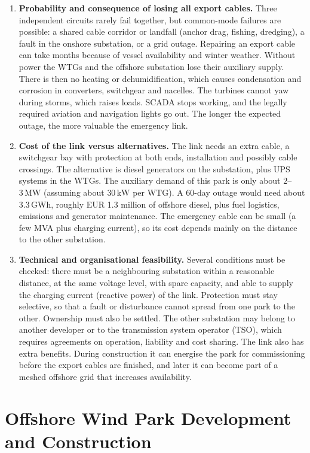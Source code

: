 \begin{enumerate}
    \item \textbf{Probability and consequence of losing all export cables.} Three independent circuits rarely fail together, but common-mode failures are possible: a shared cable corridor or landfall (anchor drag, fishing, dredging), a fault in the onshore substation, or a grid outage. Repairing an export cable can take months because of vessel availability and winter weather. Without power the WTGs and the offshore substation lose their auxiliary supply. There is then no heating or dehumidification, which causes condensation and corrosion in converters, switchgear and nacelles. The turbines cannot yaw during storms, which raises loads. SCADA stops working, and the legally required aviation and navigation lights go out. The longer the expected outage, the more valuable the emergency link.
    \item \textbf{Cost of the link versus alternatives.} The link needs an extra cable, a switchgear bay with protection at both ends, installation and possibly cable crossings. The alternative is diesel generators on the substation, plus UPS systems in the WTGs. The auxiliary demand of this park is only about $2$--$3\,\mathrm{MW}$ (assuming about $30\,\mathrm{kW}$ per WTG). A 60-day outage would need about $3.3\,\mathrm{GWh}$, roughly EUR 1.3 million of offshore diesel, plus fuel logistics, emissions and generator maintenance. The emergency cable can be small (a few MVA plus charging current), so its cost depends mainly on the distance to the other substation.
    \item \textbf{Technical and organisational feasibility.} Several conditions must be checked: there must be a neighbouring substation within a reasonable distance, at the same voltage level, with spare capacity, and able to supply the charging current (reactive power) of the link. Protection must stay selective, so that a fault or disturbance cannot spread from one park to the other. Ownership must also be settled. The other substation may belong to another developer or to the transmission system operator (TSO), which requires agreements on operation, liability and cost sharing. The link also has extra benefits. During construction it can energise the park for commissioning before the export cables are finished, and later it can become part of a meshed offshore grid that increases availability.
\end{enumerate}

\section{Offshore Wind Park Development and Construction}
\label{sec:elec-part4}

